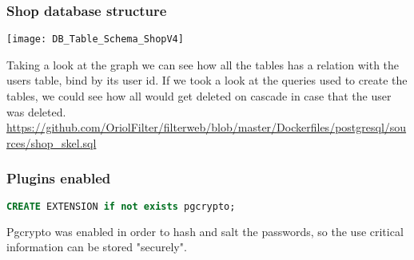 \newpage
\subsubsection[Shop database structure]{Shop database structure}
\begin{center}
    \texttt{[image: DB\_Table\_Schema\_ShopV4]}
\end{center}
\begin{flushleft}
    Taking a look at the graph we can see how all the tables has a relation with the users table, bind by its user id.
    If we took a look at the queries used to create the tables, we could see how all would get deleted on cascade in case
    that the user was deleted.
    \url{https://github.com/OriolFilter/filterweb/blob/master/Dockerfiles/postgresql/sources/shop_skel.sql}
\end{flushleft}


\subsubsection[Plugins enabled]{Plugins enabled}
\begin{lstlisting}[language=SQL,label={lst:pgcrypto_enabling}]
CREATE EXTENSION if not exists pgcrypto;
\end{lstlisting}
\begin{flushleft}
    Pgcrypto was enabled in order to hash and salt the passwords, so the use critical information can be stored "securely".
\end{flushleft}

\newpage
